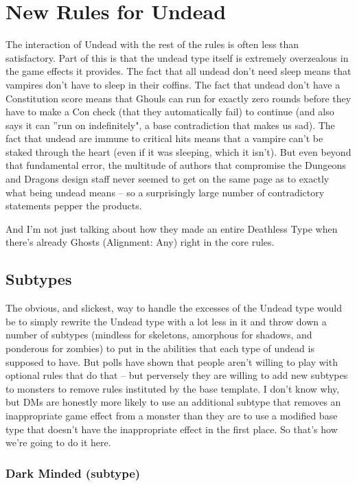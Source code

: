 \section{New Rules for Undead}

The interaction of Undead with the rest of the rules is often less than satisfactory. Part of this is that the undead type itself is extremely overzealous in the game effects it provides. The fact that all undead don't need sleep means that vampires don't have to sleep in their coffins. The fact that undead don't have a Constitution score means that Ghouls can run for exactly zero rounds before they have to make a Con check (that they automatically fail) to continue (and also says it can ''run on indefinitely", a base contradiction that makes us sad). The fact that undead are immune to critical hits means that a vampire can't be staked through the heart (even if it was sleeping, which it isn't). But even beyond that fundamental error, the multitude of authors that compromise the Dungeons and Dragons design staff never seemed to get on the same page as to exactly what being undead means -- so a surprisingly large number of contradictory statements pepper the products.

And I'm not just talking about how they made an entire Deathless Type when there's already Ghosts (Alignment: Any) right in the core rules.

\subsection{Subtypes}

The obvious, and slickest, way to handle the excesses of the Undead type would be to simply rewrite the Undead type with a lot less in it and throw down a number of subtypes (mindless for skeletons, amorphous for shadows, and ponderous for zombies) to put in the abilities that each type of undead is supposed to have. But polls have shown that people aren't willing to play with optional rules that do that -- but perversely they are willing to add new subtypes to monsters to remove rules instituted by the base template. I don't know why, but DMs are honestly more likely to use an additional subtype that removes an inappropriate game effect from a monster than they are to use a modified base type that doesn't have the inappropriate effect in the first place. So that's how we're going to do it here.


\subsubsection{Dark Minded (subtype)} \label{undead:darkminded}

